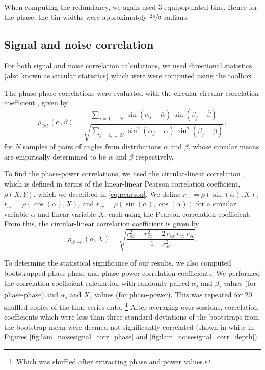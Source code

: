 When computing the redundancy, we again used \num{3} equipopulated bins.
Hence for the phase, the bin widths were approximately $\nicefrac{2\pi}{3}$ radians.


\subsection{Signal and noise correlation}
\label{sec:pl_phase_correlation}

For both signal and noise correlation calculations, we used directional statistics (also known as circular statistics) which were were computed using the  toolbox \citep{Berens2009}.

The phase-phase correlations were evaluated with the circular-circular correlation coefficient \citep[page~176]{Jammalamadaka2001}, given by
\begin{equation}
\rho_{\circlearrowleft \circlearrowleft}(\alpha, \beta) = \frac{
\sum_{j = 1, \ldots, N} \, \sin(\alpha_j - \bar{\alpha}) \, \sin(\beta_j - \bar{\beta})
}{
\sqrt{\sum_{j = 1, \ldots, N} \, \sin^2(\alpha_j - \bar{\alpha}) \, \sin^2(\beta_j - \bar{\beta})}
},
\end{equation}
for $N$ samples of pairs of angles from distributions $\alpha$ and $\beta$, whose circular means are empirically determined to be $\bar\alpha$ and $\bar\beta$ respectively.

To find the phase-power correlations, we used the circular-linear correlation \citep[Equation~27.47]{Zar1998}, which is defined in terms of the linear-linear Pearson correlation coefficient, $\rho(X,Y)$, which we described in \autoref{eq:pearson}.
We define
$r_{sx} = \rho(\sin(\alpha), X)$,
$r_{cx} = \rho(\cos(\alpha), X)$, and
$r_{sc} = \rho(\sin(\alpha), \cos(\alpha))$
for a circular variable $\alpha$ and linear variable $X$, each using the Pearson correlation coefficient.
From this, the circular-linear correlation coefficient is given by
\begin{equation}
\rho_{\circlearrowleft \rightarrow}(\alpha, X) = \sqrt{
\frac{
r_{sx}^2 + r_{cx}^2 - 2 \, r_{sx} \, r_{cx} \, r_{sc}
}{
1 - r_{sc}^2
}
}.
\end{equation}

To determine the statistical significance of our results, we also computed bootstrapped phase-phase and phase-power correlation coefficients.
We performed the correlation coefficient calculation with randomly paired $\alpha_j$ and $\beta_j$ values (for phase-phase) and $\alpha_j$ and $X_j$ values (for phase-power).
This was repeated for \num{20} shuffled copies of the time series data.%
\footnote{Which was shuffled after extracting phase and power values.}
After averaging over sessions, correlation coefficients which were less than three standard deviations of the bootstraps from the bootstrap mean were deemed not significantly correlated (shown in white in Figures \ref{fig:lam_noisesignal_corr_phase} and \ref{fig:lam_noisesignal_corr_depth}).


